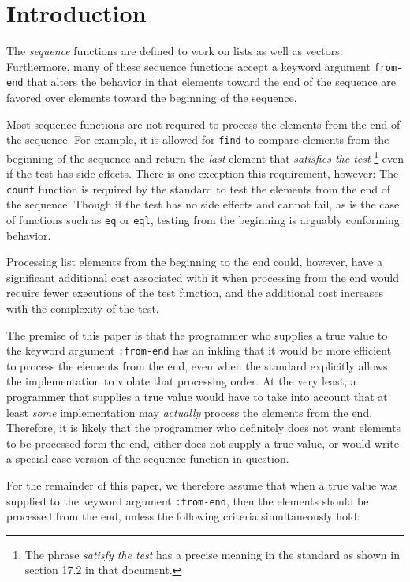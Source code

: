 \section{Introduction}

The \commonlisp{} \emph{sequence} functions are defined to work on
lists as well as vectors.  Furthermore, many of these sequence
functions accept a keyword argument \texttt{from-end} that alters the
behavior in that elements toward the end of the sequence are favored
over elements toward the beginning of the sequence.

Most sequence functions are not required to process the elements from
the end of the sequence.  For example, it is allowed for \texttt{find}
to compare elements from the beginning of the sequence and return the
\emph{last} element that \emph{satisfies the test}%
\footnote{The phrase \emph{satisfy the test} has a precise meaning in
  the \commonlisp{} standard as shown in section 17.2 in that
  document.}
even if the test has side effects.  There is one exception this
requirement, however:  The \texttt{count} function is required by the
standard to test the elements from the end of the sequence.  Though if
the test has no side effects and cannot fail, as is the case of
functions such as \texttt{eq} or \texttt{eql}, testing from the
beginning is arguably conforming behavior.

Processing list elements from the beginning to the end could, however,
have a significant additional cost associated with it when processing
from the end would require fewer executions of the test function, and
the additional cost increases with the complexity of the test.

The premise of this paper is that the programmer who supplies a true
value to the keyword argument \texttt{:from-end} has an inkling that
it would be more efficient to process the elements from the end, even
when the standard explicitly allows the implementation to violate that
processing order.  At the very least, a programmer that supplies a
true value would have to take into account that at least \emph{some}
implementation may \emph{actually} process the elements from the end.
Therefore, it is likely that the programmer who definitely does not
want elements to be processed form the end, either does not supply a
true value, or would write a special-case version of the sequence
function in question.

For the remainder of this paper, we therefore assume that when a true
value was supplied to the keyword argument \texttt{:from-end}, then
the elements should be processed from the end, unless the following
criteria simultaneously hold:

